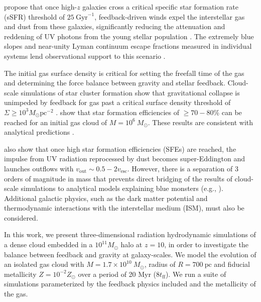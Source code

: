\documentclass[twocolumn,linenumbers]{aastex631}
\begin{document}
\citet{2023MNRAS.522.3986F} propose that once high-$z$ galaxies cross a critical specific star formation rate (sSFR) threshold of $25 \ \mathrm{Gyr}^{-1}$, feedback-driven winds expel the interstellar gas and dust from these galaxies, significantly reducing the attenuation and reddening of UV photons from the young stellar population \citep{2023MNRAS.520.2445Z,2024A&A...684A.207F}. The extremely blue slopes and near-unity Lyman continuum escape fractions measured in individual systems lend observational support to this scenario \citep{2026arXiv260202322M, 2025OJAp....8E.125F, 2024ApJ...976..160H, 2025A&A...698A.234D,2023ApJ...955L..35S}. 

The initial gas surface density is critical for setting the freefall time of the gas and determining the force balance between gravity and stellar feedback. Cloud-scale simulations of star cluster formation show that gravitational collapse is unimpeded by feedback for gas past a critical surface density threshold of $\Sigma \geq 10^3 M_\odot \mathrm{pc^{-2}}$ \citep{2023MNRAS.521.5160M,2025ApJ...987...12M,2019MNRAS.483.5548G}. \cite{2023MNRAS.521.5160M} show that star formation efficiencies of $\geq 70-80\%$ can be reached for an initial gas cloud of $M =10^6\ M_\odot$. These results are consistent with analytical predictions \citep{2010ApJ...710L.142F,2018MNRAS.473.3717F,2019MNRAS.488.1501G}.

\cite{2023MNRAS.521.5160M} also show that once high star formation efficiencies (SFEs) are reached, the impulse from UV radiation reprocessed by dust becomes super-Eddington and launches outflows with $v_\mathrm{out} \sim 0.5-2 v_\mathrm{esc}$. However, there is a separation of 3 orders of magnitude in mass that prevents direct bridging of the results of cloud-scale simulations to analytical models explaining blue monsters (e.g., \citealt{2023MNRAS.523.3201D,2023MNRAS.522.3986F}). 
Additional galactic physics, such as the dark matter potential and thermodynamic interactions with the interstellar medium (ISM), must also be considered.

In this work, we present three-dimensional radiation hydrodynamic simulations of a dense cloud embedded in a $10^{11} M_\odot$ halo at $z=10$, in order to investigate the balance between feedback and gravity at galaxy-scales. We model the evolution of an isolated gas cloud with $M = 1.7\times 10^{10}\ M_\odot$, radius of $R=700\ \mathrm{pc}$ and fiducial metallicity $Z=10^{-2}Z_\odot$ over a period of 20 Myr ($8t_\mathrm{ff}$). We run a suite of simulations parameterized by the feedback physics included and the metallicity of the gas.
\end{document}
